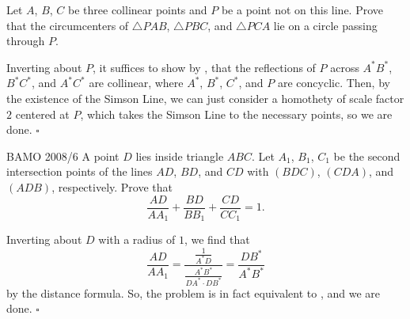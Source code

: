 \documentclass{article}
\begin{document}
\begin{problem}[8.25]{}
Let $A$, $B$, $C$ be three collinear points and $P$ be a point not on this line. Prove that the circumcenters of $\triangle PAB$, $\triangle PBC$, and $\triangle PCA$ lie on a circle passing through $P$.
\end{problem}
Inverting about $P$, it suffices to show by , that the reflections of $P$ across $A^*B^*$, $B^*C^*$, and $A^*C^*$ are collinear, where $A^*$, $B^*$, $C^*$, and $P$ are concyclic. Then, by the existence of the Simson Line, we can just consider a homothety of scale factor $2$ centered at $P$, which takes the Simson Line to the necessary points, so we are done. $\square$

\begin{problem}[8.26]{BAMO 2008/6}
A point $D$ lies inside triangle $ABC$. Let $A_1$, $B_1$, $C_1$ be the second intersection points of the lines $AD$, $BD$, and $CD$ with $(BDC)$, $(CDA)$, and $(ADB)$, respectively. Prove that \[\dfrac{AD}{AA_1}+\dfrac{BD}{BB_1}+\dfrac{CD}{CC_1} = 1.\]
\end{problem}
Inverting about $D$ with a radius of $1$, we find that \[\dfrac{AD}{AA_1} = \dfrac{\tfrac{1}{A^*D}}{\tfrac{A^*B^*}{DA^*\cdot DB^*}} = \dfrac{DB^*}{A^*B^*}\] by the distance formula. So, the problem is in fact equivalent to , and we are done. $\square$
\end{document}
